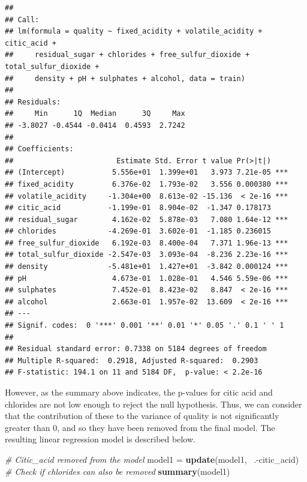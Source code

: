 \documentclass[12pt,]{article}
\newenvironment{Shaded}{\begin{snugshade}}{\end{snugshade}}
\newcommand{\KeywordTok}[1]{\textcolor[rgb]{0.13,0.29,0.53}{\textbf{{#1}}}}
\newcommand{\StringTok}[1]{\textcolor[rgb]{0.31,0.60,0.02}{{#1}}}
\newcommand{\CommentTok}[1]{\textcolor[rgb]{0.56,0.35,0.01}{\textit{{#1}}}}
\newcommand{\NormalTok}[1]{{#1}}
\begin{document}
\begin{verbatim}
## 
## Call:
## lm(formula = quality ~ fixed_acidity + volatile_acidity + citic_acid + 
##     residual_sugar + chlorides + free_sulfur_dioxide + total_sulfur_dioxide + 
##     density + pH + sulphates + alcohol, data = train)
## 
## Residuals:
##     Min      1Q  Median      3Q     Max 
## -3.8027 -0.4544 -0.0414  0.4593  2.7242 
## 
## Coefficients:
##                        Estimate Std. Error t value Pr(>|t|)    
## (Intercept)           5.556e+01  1.399e+01   3.973 7.21e-05 ***
## fixed_acidity         6.376e-02  1.793e-02   3.556 0.000380 ***
## volatile_acidity     -1.304e+00  8.613e-02 -15.136  < 2e-16 ***
## citic_acid           -1.199e-01  8.904e-02  -1.347 0.178173    
## residual_sugar        4.162e-02  5.878e-03   7.080 1.64e-12 ***
## chlorides            -4.269e-01  3.602e-01  -1.185 0.236015    
## free_sulfur_dioxide   6.192e-03  8.400e-04   7.371 1.96e-13 ***
## total_sulfur_dioxide -2.547e-03  3.093e-04  -8.236 2.23e-16 ***
## density              -5.481e+01  1.427e+01  -3.842 0.000124 ***
## pH                    4.673e-01  1.028e-01   4.546 5.59e-06 ***
## sulphates             7.452e-01  8.423e-02   8.847  < 2e-16 ***
## alcohol               2.663e-01  1.957e-02  13.609  < 2e-16 ***
## ---
## Signif. codes:  0 '***' 0.001 '**' 0.01 '*' 0.05 '.' 0.1 ' ' 1
## 
## Residual standard error: 0.7338 on 5184 degrees of freedom
## Multiple R-squared:  0.2918, Adjusted R-squared:  0.2903 
## F-statistic: 194.1 on 11 and 5184 DF,  p-value: < 2.2e-16
\end{verbatim}

However, as the summary above indicates, the p-values for citic acid and
chlorides are not low enough to reject the null hypothesis. Thus, we can
consider that the contribution of these to the variance of quality is
not significantly greater than 0, and so they have been removed from the
final model. The resulting linear regression model is described below.

\begin{Shaded}
\begin{Highlighting}[]
\CommentTok{# Citic_acid removed from the model}
\NormalTok{model1 =}\StringTok{ }\KeywordTok{update}\NormalTok{(model1, ~.-citic_acid)}
\CommentTok{# Check if chlorides can also be removed}
\KeywordTok{summary}\NormalTok{(model1)}
\end{Highlighting}
\end{Shaded}
\end{document}
